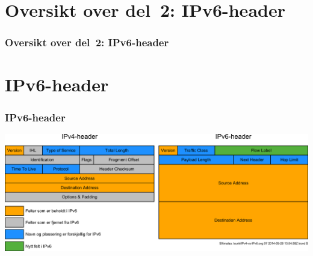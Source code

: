 \begin{frame}
  \partpage
\end{frame}

\section*{Oversikt over del~2: IPv6-header}
\begin{frame}[allowframebreaks]
  \frametitle{Oversikt over del~2: IPv6-header}
    \tableofcontents%
\end{frame}

\section{IPv6-header}
\begin{frame}%
  \frametitle{IPv6-header}
  \pause
  \begin{center}
      {\includegraphics[scale=.2274]{IPv4-vs-IPv6.pdf}}
  \end{center}
\end{frame}

